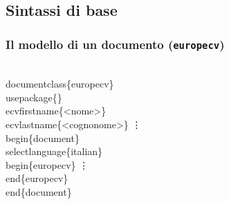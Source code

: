 \documentclass[svgnames,%
	ucs,%
	pdftex]{guitbeamer}
\begin{document}
\subsection{Sintassi di base}
\begin{frame}
  \frametitle{Il modello di un documento (\texttt{europecv})}
	\begin{LaTeXcode}
		\\documentclass\{\alert{europecv}\}\n
	  \onslide<2->
		\\usepackage\{<nome-package>\}\n
	  \onslide<3->
		\alert{\\ecvfirstname\{}<nome>\alert{\}}\n
		\alert{\\ecvlastname\{}<cognonome>\alert{\}}\n
		\hspace*{10ex}\vdots\n
	  \smallskip
	  \onslide<4->
		\\begin\{document\}\n
	  \onslide<5->
		\\selectlanguage\{italian\}\n
	  \onslide<6->
		\hspace*{5ex}\\begin\{\alert{europecv}\}\n
		\hspace*{15ex}\vdots\n
		\hspace*{5ex}\\end\{\alert{europecv}\}\n
	  \onslide<4->
		\smallskip
		\\end\{document\}
	\end{LaTeXcode}
\end{frame}
\end{document}

